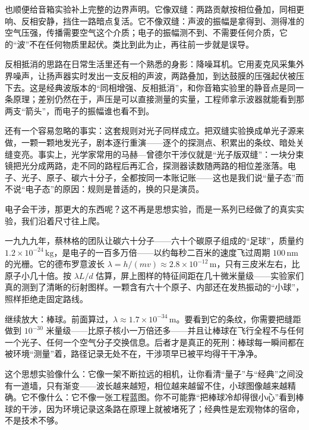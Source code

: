 也顺便给音箱实验补上完整的边界声明。它像双缝：两路贡献按相位叠加，同相更响、反相安静，挡住一路暗点复活。它不像双缝：声波的振幅是拿得到、测得准的空气压强，传播需要空气这个介质；电子的振幅测不到、不需要任何介质，它的“波”不在任何物质里起伏。类比到此为止，再往前一步就是误导。

反相抵消的思路在日常生活里还有一个熟悉的身影：降噪耳机。它用麦克风采集外界噪声，让扬声器实时发出一支反相的声波，两路叠加，到达鼓膜的压强起伏被压下去。这是经典波版本的“同相增强、反相抵消”，和你音箱实验里的静音点是同一条原理；差别仍然在于，声压是可以直接测量的实量，工程师拿示波器就能看到那两支“箭头”，而电子的振幅谁也看不到。

还有一个容易忽略的事实：这套规则对光子同样成立。把双缝实验换成单光子源来做，一颗一颗地发光子，剧本逐行重演——逐个的探测点、积累出的条纹、暗处关缝变亮。事实上，光学家常用的马赫—曾德尔干涉仪就是“光子版双缝”：一块分束镜把光分成两路，走不同的路程后再汇合，探测器读数随两路的相位差涨落。电子、光子、原子、碳六十分子，全都按同一本账记账——这也是我们说“量子态”而不说“电子态”的原因：规则是普适的，换的只是演员。


\begin{thought}
电子会干涉，那更大的东西呢？这不再是思想实验，而是一系列已经做了的真实实验，我们沿着尺寸往上爬。

一九九九年，蔡林格的团队让碳六十分子——六十个碳原子组成的“足球”，质量约 \(1.2\times10^{-24}\,\mathrm{kg}\)，是电子的一百多万倍——以约每秒二百米的速度飞过周期 \(100\,\mathrm{nm}\) 的光栅。它的德布罗意波长 \(\lambda = h/(mv) \approx 2.8\times10^{-12}\,\mathrm{m}\)，只有三皮米左右，比原子小几十倍。按 \(\lambda L/d\) 估算，屏上图样的特征间距在几十微米量级——实验家们真的测到了清晰的衍射图样。一颗含有六十个原子、内部还在发热振动的“小球”，照样拒绝走固定路线。

继续放大：棒球。前面算过，\(\lambda \approx 1.7\times10^{-34}\,\mathrm{m}\)。要看到它的条纹，你需要把缝距做到 \(10^{-30}\) 米量级——比原子核小一万倍还多——并且让棒球在飞行全程不与任何一个光子、任何一个空气分子交换信息。后者才是真正的死刑：棒球每一瞬间都在被环境“测量”着，路径记录无处不在，干涉项早已被平均得干干净净。

这个思想实验像什么：它像一架不断拉远的相机，让你看清“量子”与“经典”之间没有一道墙，只有渐变——波长越来越短，相位越来越留不住，小球图像越来越精确。它不像什么：它不像一张工程蓝图。你不可能靠“把棒球冷却得很小心”看到棒球的干涉，因为环境记录这条路在原理上就被堵死了；经典性是宏观物体的宿命，不是技术不够。
\end{thought}

